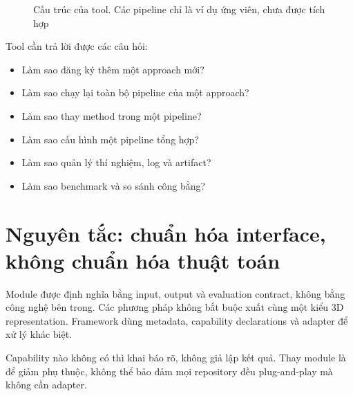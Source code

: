 \begin{figure}[H]
  \centering
  \caption{Cấu trúc của tool. Các pipeline chỉ là ví dụ ứng viên, chưa được tích hợp}
\end{figure}

Tool cần trả lời được các câu hỏi:
\begin{itemize}
  \item Làm sao đăng ký thêm một approach mới?
  \item Làm sao chạy lại toàn bộ pipeline của một approach?
  \item Làm sao thay method trong một pipeline?
  \item Làm sao cấu hình một pipeline tổng hợp?
  \item Làm sao quản lý thí nghiệm, log và artifact?
  \item Làm sao benchmark và so sánh công bằng?
\end{itemize}

\section{Nguyên tắc: chuẩn hóa interface, không chuẩn hóa thuật toán}

Module được định nghĩa bằng input, output và evaluation contract, không bằng công nghệ bên trong.
Các phương pháp không bắt buộc xuất cùng một kiểu 3D representation.
Framework dùng metadata, capability declarations và adapter để xử lý khác biệt.

Capability nào không có thì khai báo rõ, không giả lập kết quả.
Thay module là để giảm phụ thuộc, không thể bảo đảm mọi repository đều plug-and-play mà không cần adapter.

